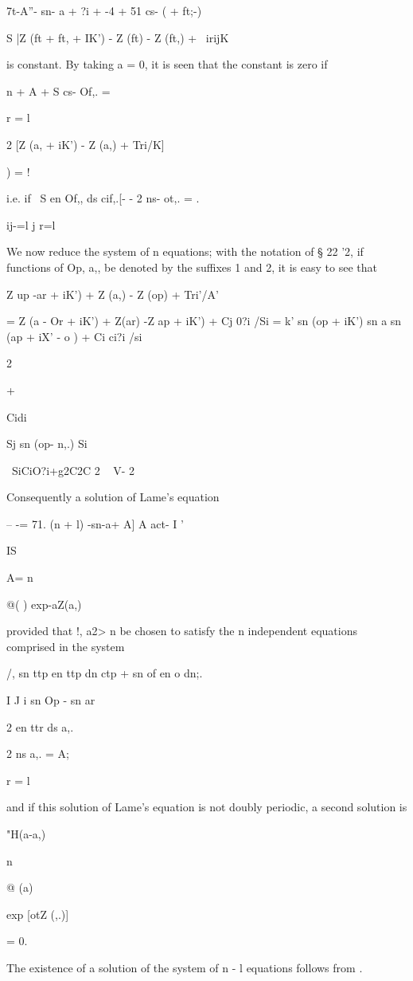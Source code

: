 {{{{{{{{7t-A''- sn- a + ?i + -4 + 51 cs- ( + ft;-)

S |Z (ft + ft, + IK') - Z (ft) - Z (ft,) + \ irijK\

%
%

is constant. By taking a = 0, it is seen that the constant is zero if

n + A + S cs- Of,. =

r = l

2 [Z (a, + iK') - Z (a,) + Tri/K]

) = !

i.e. if \ S en Of,, ds cif,.[- - 2 ns- ot,. = .

ij-=l j r=l

We now reduce the system of n equations; with the notation of § 22
'2, if functions of Op, a,, be denoted by the suffixes 1 and 2, it is
easy to see that

Z up -ar + iK') + Z (a,) - Z (op) + Tri'/A'

= Z (a - Or + iK') + Z(ar) -Z ap + iK') + Cj 0?i /Si = k' sn (op +
iK') sn a sn (ap + iX' - o ) + Ci ci?i /si

 2

+

Cidi

Sj sn (op- n,.) Si

\ SiCiO?i+g2C2C 2 ~ V- 2

Consequently a solution of Lame's equation

-- -= 71. (n + l) -sn-a+ A] A act- I '

IS

A= n

@( ) exp-aZ(a,)

provided that !, a2>  n be chosen to satisfy the n independent
equations comprised in the system

/, sn ttp en ttp dn ctp + sn of en o dn;. \

I J i sn Op - sn ar

2 en ttr ds a,.

2 ns a,. = A;

r = l

and if this solution of Lame's equation is not doubly periodic, a
second solution is

"H(a-a,)

n

@ (a)

exp [otZ (,.)]

= 0.

The existence of a solution of the system of n - l equations follows
from .

}}}}}}}}

